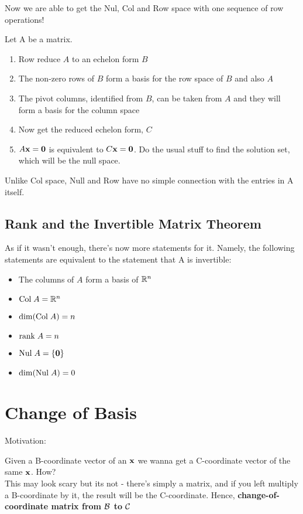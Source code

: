 \documentclass{report}
\begin{document}
Now we are able to get the Nul, Col and Row space with one sequence of row operations!
\begin{tcolorbox}[colback=blue!5!white, colframe=blue!75!black, title=Getting the trio]
Let A be a matrix.
\begin{enumerate}
    \item Row reduce $A$ to an echelon form $B$
    \item The non-zero rows of $B$ form a basis for the row space of $B$ and also $A$
    \item The pivot columns, identified from $B$, can be taken from $A$ and they will 
    form a basis for the column space
    \item Now get the reduced echelon form, $C$
    \item $A\mathbf{x} = \mathbf{0}$ is equivalent to $C\mathbf{x} = \mathbf{0}$. Do the usual stuff to find the 
    solution set, which will be the null space.
\end{enumerate}
Unlike Col space, Null and Row have no simple connection with the entries in A itself.
\end{tcolorbox}

\subsection{Rank and the Invertible Matrix Theorem}
As if it wasn't enough, there's now more statements for it.
Namely, the following statements are equivalent to the statement that A is invertible:
\begin{itemize}
    \item The columns of $A$ form a basis of $\mathbb{R}^n$
    \item $\mathrm{Col}\; A = \mathbb{R}^n$
    \item $\dim (\mathrm{Col}\; A) = n$
    \item $\mathrm{rank}\; A = n$
    \item $\mathrm{Nul}\; A = \{\mathbf{0}\}$
    \item $\dim (\mathrm{Nul}\; A) = 0$
\end{itemize}

\section{Change of Basis}

Motivation:

Given a B-coordinate vector of an $\mathbf{x}$ we wanna get a C-coordinate
vector of the same $\mathbf{x}$. How?\\

This may look scary but its not - there's simply a matrix, and if you left multiply
a B-coordinate by it, the result will be the C-coordinate. Hence, \textbf{change-of-coordinate matrix from $\mathcal{B}$ to $\mathcal{C}$}
\end{document}
